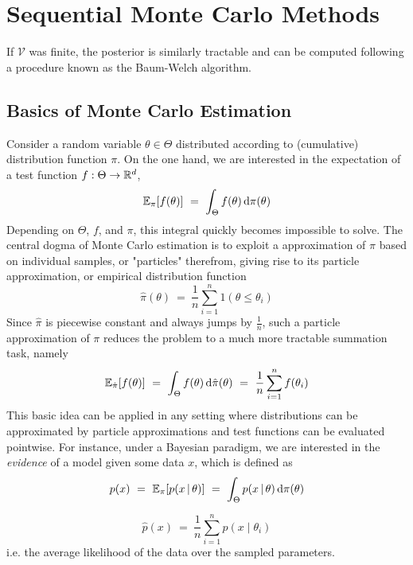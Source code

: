 \chapter{Sequential Monte Carlo Methods} 

If $\mathcal{V}$ was finite, the posterior is similarly tractable and can be computed following a procedure known as the Baum-Welch algorithm.

\section{Basics of Monte Carlo Estimation}

Consider a random variable $\theta \in \Theta$ distributed according to (cumulative) distribution function $\pi$. On the one hand, we are interested in the expectation of a test function $f: \Theta \to \mathbb{R}^d$,
\begin{align*}
\operatorname{\mathbb{E}}_\pi[f(\theta)] ~ = ~ \int_\Theta f(\theta) \, \textrm{d} \pi(\theta)
\end{align*}
Depending on $\Theta$, $f$, and $\pi$, this integral quickly becomes impossible to solve. The central dogma of Monte Carlo estimation is to exploit a approximation of $\pi$ based on individual samples, or "particles" therefrom, giving rise to its particle approximation, or empirical distribution function
\begin{equation*}
\hat{\pi}(\theta) ~ = ~ \frac{1}{n} \sum_{i=1}^n 1(\theta \leq \theta_i)
\end{equation*}
Since $\hat{\pi}$ is piecewise constant and always jumps by $\frac{1}{n}$, such a particle approximation of $\pi$ reduces the problem to a much more tractable summation task, namely
\begin{equation*}
\operatorname{\mathbb{E}}_{\hat{\pi}}[f(\theta)] ~ = ~ \int_\Theta f(\theta) \, \textrm{d} \hat{\pi}(\theta) ~ = ~ \frac{1}{n} \sum_{i=1}^n f(\theta_i)
\end{equation*}
This basic idea can be applied in any setting where distributions can be approximated by particle approximations and test functions can be evaluated pointwise. For instance, under a Bayesian paradigm, we are interested in the \emph{evidence} of a model given some data $x$, which is defined as
\begin{equation*}
p(x) ~ = ~ \operatorname{\mathbb{E}}_\pi[p(x \,|\, \theta)] ~ = ~ \int_\Theta p(x \,|\, \theta) \, \textrm{d} \pi(\theta)
\end{equation*}

\begin{equation*}
\widehat{p}(x) ~ = ~ \frac{1}{n} \sum_{i=1}^n p(x \mid \theta_i)
\end{equation*}
i.e. the average likelihood of the data over the sampled parameters.


